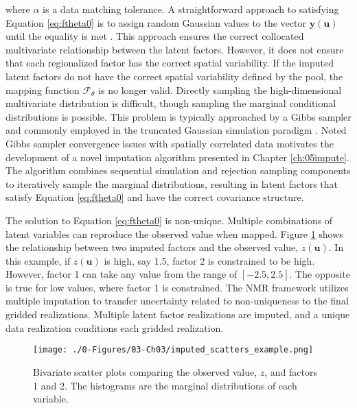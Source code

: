 \lowercase{Where} $\alpha$ is a data matching tolerance. A straightforward approach to satisfying Equation \ref{eq:ftheta0} is to assign random Gaussian values to the vector $\mathbf{y}(\mathbf{u})$ until the equality is met \citep{silva2018enhanced}. This approach ensures the correct collocated multivariate relationship between the latent factors. However, it does not ensure that each regionalized factor has the correct spatial variability. If the imputed latent factors do not have the correct spatial variability defined by the pool, the mapping function $\mathcal{F}_{\theta}$ is no longer valid. Directly sampling the high-dimensional multivariate distribution is difficult, though sampling the marginal conditional distributions is possible. This problem is typically approached by a Gibbs sampler \citep{geman1984stochastic} and commonly employed in the truncated Gaussian simulation paradigm \citep{arroyo2020iterative,madani2021enhanced}. Noted Gibbs sampler convergence issues with spatially correlated data motivates the development of a novel imputation algorithm presented in Chapter \ref{ch:05impute}. The algorithm combines sequential simulation and rejection sampling components to iteratively sample the marginal distributions, resulting in latent factors that satisfy Equation \ref{eq:ftheta0} and have the correct covariance structure.

The solution to Equation \ref{eq:ftheta0} is non-unique. Multiple combinations of latent variables can reproduce the observed value when mapped. Figure \ref{fig:imputed_scatters_example} shows the relationship between two imputed factors and the observed value, $z(\mathbf{u})$. In this example, if $z(\mathbf{u})$ is high, say 1.5, factor 2 is constrained to be high. However, factor 1 can take any value from the range of $[-2.5, 2.5]$. The opposite is true for low values, where factor 1 is constrained. The \gls{NMR} framework utilizes multiple imputation to transfer uncertainty related to non-uniqueness to the final gridded realizations. Multiple latent factor realizations are imputed, and a unique data realization conditions each gridded realization.

\begin{figure}[htb!]
    \centering
    \texttt{[image: ./0-Figures/03-Ch03/imputed\_scatters\_example.png]}
    \caption{Bivariate scatter plots comparing the observed value, $z$, and factors 1 and 2. The histograms are the marginal distributions of each variable. }
    \label{fig:imputed_scatters_example}
\end{figure}

